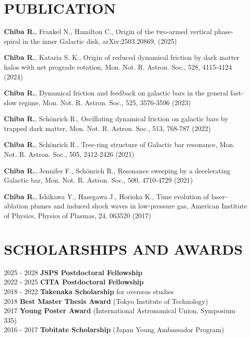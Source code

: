\documentclass[]{res}
\begin{document}
\begin{resume}
\section{PUBLICATION}
\begin{etaremune}[leftmargin=6mm,rightmargin=-6mm]
    \item \textbf{Chiba R.}, Frankel N., Hamilton C., Origin of the two-armed vertical phase-spiral in the inner Galactic disk, arXiv:2503.20869, (2025)
    \item \textbf{Chiba R.}, Kataria S. K., Origin of reduced dynamical friction by dark matter halos with net prograde rotation, Mon. Not. R. Astron. Soc., 528, 4115-4124 (2024)
    \item \textbf{Chiba R.}, Dynamical friction and feedback on galactic bars in the general fast-slow regime, Mon. Not. R. Astron. Soc., 525, 3576-3596 (2023)
    \item \textbf{Chiba R.}, Schönrich R., Oscillating dynamical friction on galactic bars by trapped dark matter, Mon. Not. R. Astron. Soc., 513, 768-787 (2022)
    \item \textbf{Chiba R.}, Schönrich R., Tree-ring structure of Galactic bar resonance, Mon. Not. R. Astron. Soc., 505, 2412-2426 (2021)
    \item \textbf{Chiba R.}, Jennifer F., Schönrich R., Resonance sweeping by a decelerating Galactic bar, Mon. Not. R. Astron. Soc., 500, 4710-4729 (2021)
    \item \textbf{Chiba R.}, Ishikawa Y., Hasegawa J., Horioka K., Time evolution of laser-ablation plumes and induced shock waves in low-pressure gas, American Institute of Physics, Physics of Plasmas, 24, 063520 (2017)
\end{etaremune}

\section{SCHOLARSHIPS AND AWARDS}
\noindent
\begin{tabbing}
    2025 - 2028 \hspace{2mm} \=\textbf{JSPS Postdoctoral Fellowship}\\
    2022 - 2025 \hspace{2mm} \=\textbf{CITA Postdoctoral Fellowship}\\
    2018 - 2022 \hspace{2mm} \=\textbf{Takenaka Scholarship} for overseas studies\\
    2018        \hspace{2mm} \>\textbf{Best Master Thesis Award} (Tokyo Institute of Technology)\\
    2017        \hspace{2mm} \>\textbf{Young Poster Award} (International Astronomical Union, Symposium 335)\\
    2016 - 2017 \hspace{2mm} \>\textbf{Tobitate Scholarship} (Japan Young Ambassador Program)
\end{tabbing}


\end{resume}
\end{document}
